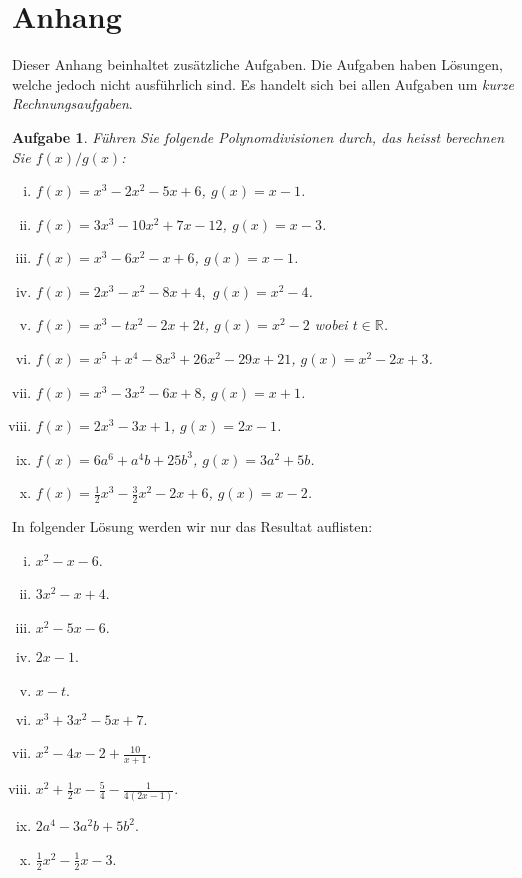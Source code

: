 \documentclass[a4paper, 20]{exam}
\newtheorem{ex}{Aufgabe}
\begin{document}
\section{Anhang}

Dieser Anhang beinhaltet zusätzliche Aufgaben. Die Aufgaben haben Lösungen, welche jedoch nicht ausführlich sind. Es handelt sich bei allen Aufgaben um \textit{kurze Rechnungsaufgaben}.
\begin{ex} Führen Sie folgende Polynomdivisionen durch, das heisst berechnen Sie $f(x)/g(x)$:
\begin{enumerate}[i)]
\item $f(x)= x^3-2x^2-5x+6$, $g(x)=x-1$.
\item $f(x)=3x^3-10x^2+7x-12$, $g(x)=x-3$.
\item $f(x)=x^3-6x^2-x+6$, $g(x)=x-1$.
\item $f(x)=2x^3-x^2-8x+4,$ $g(x)=x^2-4$.
\item $f(x)=x^3-tx^2-2x+2t$, $g(x)=x^2-2$ wobei $t \in \mathbb{R}$.
\item $f(x)=x^5+x^4-8x^3+26x^2-29x+21$, $g(x)=x^2-2x+3$.
\item $f(x)=x^3-3x^2-6x+8$, $g(x)=x+1$.
\item $f(x)=2x^3-3x+1$, $g(x)=2x-1$.
\item $f(x)=6a^6+a^4b+25b^3$, $g(x)=3a^2 + 5b$.
\item $f(x)=\frac{1}{2}x^3- \frac{3}{2}x^2-2x+6$, $g(x)=x-2$. 
\end{enumerate}
\end{ex}

\begin{solution} In folgender Lösung werden wir nur das Resultat auflisten:
\begin{enumerate}[i)]
\item $x^2-x-6$.
\item $3x^2-x+4$.
\item $x^2-5x-6.$
\item $2x-1$.
\item $x-t.$
\item $x^3+3x^2-5x+7$.
\item $x^2-4x-2 + \frac{10}{x+1}$.
\item $x^2+ \frac{1}{2}x- \frac{5}{4}- \frac{1}{4(2x-1)}.$
\item $2a^4-3a^2b+ 5b^2$.
\item $ \frac{1}{2}x^2- \frac{1}{2}x-3$. 
\end{enumerate}
\end{solution}
\end{document}
